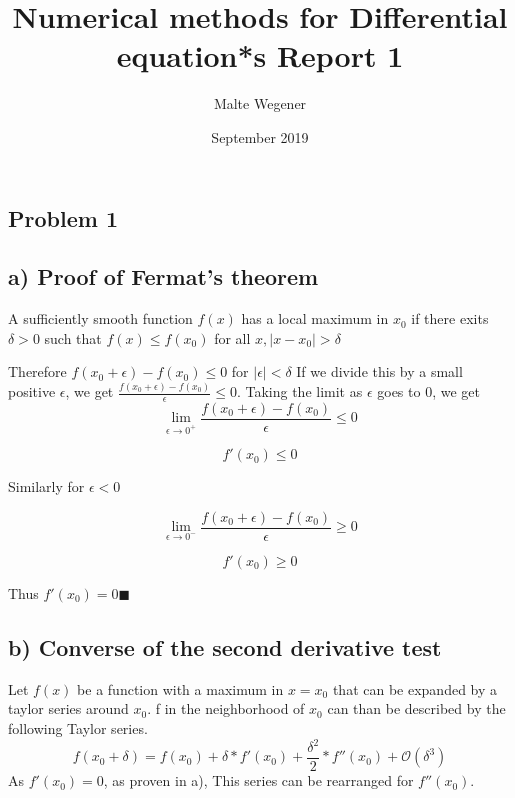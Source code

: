 \documentclass{article}
\title{Numerical methods for Differential equation*s Report 1}
\author{Malte Wegener}
\date{September 2019}
\begin{document}
\maketitle
\begin{multicols}{2}
    
\section{Problem 1}
\subsection{a) Proof of Fermat's theorem}

A sufficiently smooth function $f(x)$ has a local maximum in $x_{0}$ if there exits $\delta > 0$ such that $f(x) \leq f(x_{0})$ for all $x, \mid x - x_{0} \mid > \delta$ \par
Therefore $f(x_{0}+\epsilon)-f(x_{0}) \leq 0$ for $\mid \epsilon \mid < \delta$
If we divide this by a small positive $\epsilon$, we get $\frac{f(x_{0}+\epsilon)-f(x_{0})}{\epsilon}\leq 0$.
Taking the limit as $\epsilon$ goes to 0, we get
\begin{equation*}
   \lim_{\epsilon\to 0^{+}} \frac{f(x_{0}+\epsilon)-f(x_{0})}{\epsilon}\leq 0
\end{equation*}

\begin{equation*}
   f'(x_{0})\leq 0
\end{equation*}

Similarly for $\epsilon < 0$

\begin{equation*}
   \lim_{\epsilon\to 0^{-}} \frac{f(x_{0}+\epsilon)-f(x_{0})}{\epsilon}\geq 0
  \end{equation*}
   
\begin{equation*}
   f'(x_{0})\geq 0
\end{equation*}

Thus $f'(x_{0}) = 0 \blacksquare$

\subsection{b) Converse of the second derivative test}
Let $f(x)$ be a function with a maximum in $x=x_{0}$ that can be expanded by a taylor series around $x_{0}$. f in the neighborhood of $x_{0}$ can than be described by the following Taylor series.
\begin{equation*}
    f(x_{0}+\delta) = f(x_{0})+\delta*f'(x_{0})+\frac{\delta^2}{2}*f''(x_{0}) + \mathcal{O}(\delta^3)
\end{equation*}
As $f'(x_{0}) = 0$, as proven in a), This series can be rearranged for $f''(x_{0})$.


\end{multicols}
\end{document}

